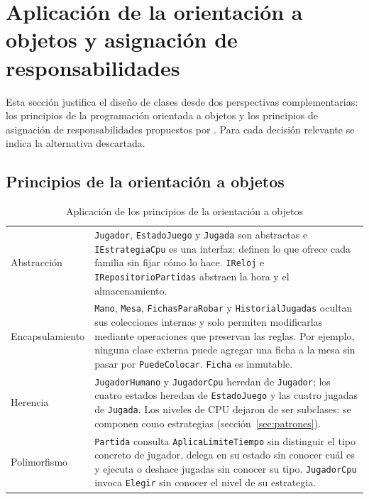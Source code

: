 \section{Aplicación de la orientación a objetos y asignación de responsabilidades}\label{sec:responsabilidades}

Esta sección justifica el diseño de clases desde dos perspectivas complementarias: los principios de la programación orientada a objetos y los principios de asignación de responsabilidades propuestos por \citet{larman2003uml}. Para cada decisión relevante se indica la alternativa descartada.

\subsection{Principios de la orientación a objetos}

\begin{table}[H]
\caption{Aplicación de los principios de la orientación a objetos}\label{tab:poo}
\tablacompacta
\begin{tabularx}{\textwidth}{@{}L{2.9cm}Y@{}}
  \toprule
   &  \\ \midrule
  Abstracción & \texttt{Jugador}, \texttt{EstadoJuego} y \texttt{Jugada} son abstractas e \texttt{IEstrategiaCpu} es una interfaz: definen lo que ofrece cada familia sin fijar cómo lo hace. \texttt{IReloj} e \texttt{IRepositorioPartidas} abstraen la hora y el almacenamiento. \\ \filasep
  Encapsulamiento & \texttt{Mano}, \texttt{Mesa}, \texttt{FichasParaRobar} y \texttt{HistorialJugadas} ocultan sus colecciones internas y solo permiten modificarlas mediante operaciones que preservan las reglas. Por ejemplo, ninguna clase externa puede agregar una ficha a la mesa sin pasar por \texttt{PuedeColocar}. \texttt{Ficha} es inmutable. \\ \filasep
  Herencia & \texttt{JugadorHumano} y \texttt{JugadorCpu} heredan de \texttt{Jugador}; los cuatro estados heredan de \texttt{EstadoJuego} y las cuatro jugadas de \texttt{Jugada}. Los niveles de CPU dejaron de ser subclases: se componen como estrategias (sección~\ref{sec:patrones}). \\ \filasep
  Polimorfismo & \texttt{Partida} consulta \texttt{AplicaLimiteTiempo} sin distinguir el tipo concreto de jugador, delega en su estado sin conocer cuál es y ejecuta o deshace jugadas sin conocer su tipo. \texttt{JugadorCpu} invoca \texttt{Elegir} sin conocer el nivel de su estrategia. \\
  \bottomrule
\end{tabularx}
\end{table}

